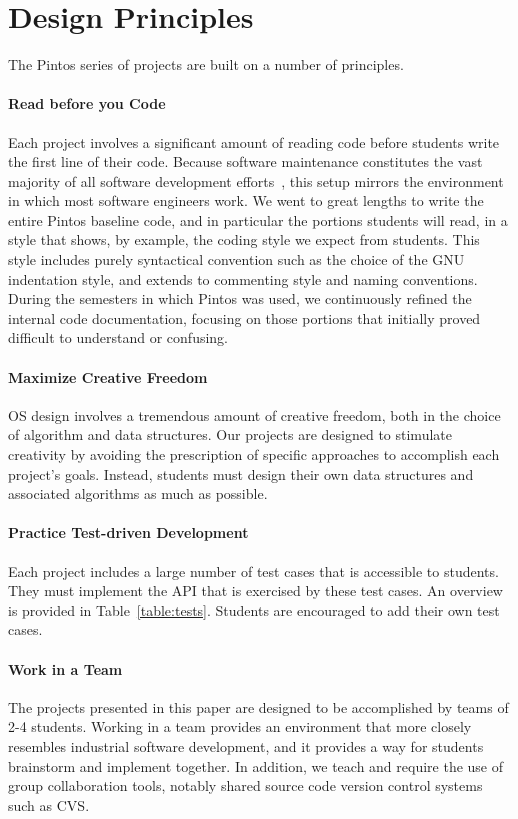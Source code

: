 \section{Design Principles}
\label{sec:designprinciples}

The Pintos series of projects are built on a number of principles.

\paragraph{Read before you Code}
Each project involves a significant amount of reading code before
students write the first line of their code.  
Because software maintenance constitutes the vast majority of all
software development efforts~\cite{Boehm1981Software}, this setup mirrors the 
environment in which most software engineers work.
We went to great lengths to write the entire Pintos baseline code,
and in particular the portions students will read, in a style that shows,
by example, the coding style we expect from students.  This style
includes purely syntactical convention such as the choice of the
GNU indentation style, and extends to commenting style and naming 
conventions.  During the semesters in which Pintos was used, we
continuously refined the internal code documentation, focusing on those 
portions that initially proved difficult to understand or confusing.

\paragraph{Maximize Creative Freedom}
OS design involves a tremendous amount of creative freedom, both in the
choice of algorithm and data structures.  Our projects are designed to
stimulate creativity by avoiding the prescription of specific approaches
to accomplish each project's goals.  Instead, students must design their
own data structures and associated algorithms as much as possible.

\paragraph{Practice Test-driven Development}
Each project includes a large number of test cases that is accessible
to students.  
They must implement the API that is exercised by these test cases.  An overview is provided in Table~\ref{table:tests}.
Students are encouraged to add their own test cases.

\paragraph{Work in a Team}
The projects presented in this paper are designed to be accomplished by teams of 
2-4 students.  Working in a team provides an environment that more closely resembles
industrial software development, and it provides a way for students brainstorm and
implement together.  In addition, we teach and require the use of group collaboration tools,
notably shared source code version control systems such as CVS.

